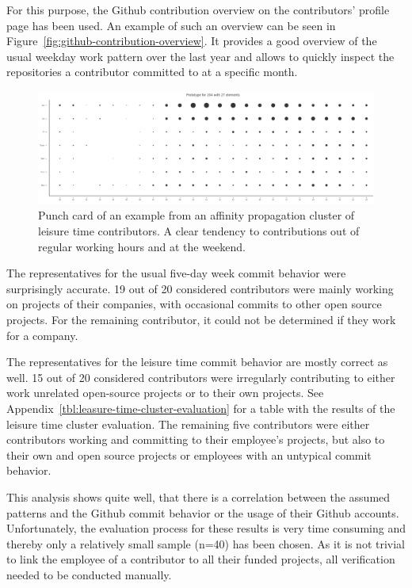 For this purpose, the Github contribution overview on the contributors' profile page has been used.
An example of such an overview can be seen in Figure~\ref{fig:github-contribution-overview}.
It provides a good overview of the usual weekday work pattern over the last year and allows to quickly inspect the repositories a contributor committed to at a specific month.

\begin{figure}[H]
    \includegraphics[scale=0.32]{./graphs/analysis-affinity/204}
    \centering
    \caption{Punch card of an example from an affinity propagation cluster of leisure time contributors. A clear tendency to contributions out of regular working hours and at the weekend.}\label{fig:leisure-time-hours}
\end{figure}

The representatives for the usual five-day week commit behavior were surprisingly accurate.
19 out of 20 considered contributors were mainly working on projects of their companies, with occasional commits to other open source projects.
For the remaining contributor, it could not be determined if they work for a company.


The representatives for the leisure time commit behavior are mostly correct as well.
15 out of 20 considered contributors were irregularly contributing to either work unrelated open-source projects or to their own projects.
See Appendix~\ref{tbl:leasure-time-cluster-evaluation} for a table with the results of the leisure time cluster evaluation.
The remaining five contributors were either contributors working and committing to their employee's projects, but also to their own and open source projects or employees with an untypical commit behavior.

This analysis shows quite well, that there is a correlation between the assumed patterns and the Github commit behavior or the usage of their Github accounts.
Unfortunately, the evaluation process for these results is very time consuming and thereby only a relatively small sample (n=40) has been chosen.
As it is not trivial to link the employee of a contributor to all their funded projects, all verification needed to be conducted manually.

